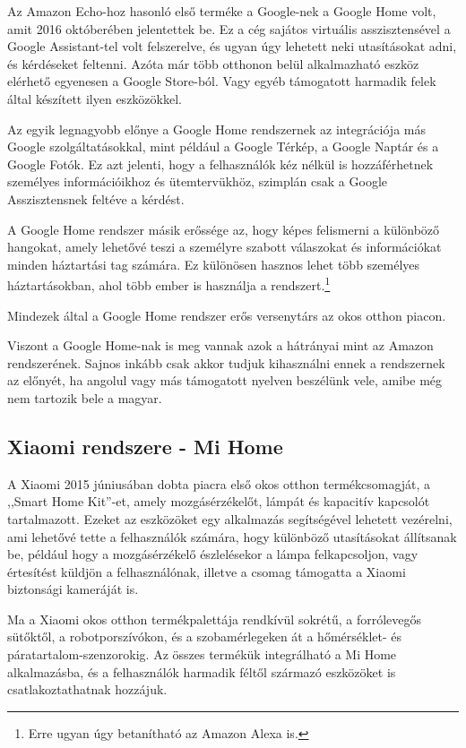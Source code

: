 \documentclass[
]{thesis-ekf}
\theoremstyle{definition}
\theoremstyle{remark}
\begin{document}
	Az Amazon Echo-hoz hasonló első terméke a Google-nek a Google Home volt, amit 2016 októberében jelentettek be. Ez a cég sajátos virtuális asszisztensével a Google Assistant-tel volt felszerelve, és ugyan úgy lehetett neki utasításokat adni, és kérdéseket feltenni. Azóta már több otthonon belül alkalmazható eszköz elérhető egyenesen a Google Store-ból. Vagy egyéb támogatott harmadik felek által készített ilyen eszközökkel.
	
	Az egyik legnagyobb előnye a Google Home rendszernek az integrációja más Google szolgáltatásokkal, mint például a Google Térkép, a Google Naptár és a Google Fotók. Ez azt jelenti, hogy a felhasználók kéz nélkül is hozzáférhetnek személyes információikhoz és ütemtervükhöz, szimplán csak a Google Asszisztensnek feltéve a kérdést.
	
	A Google Home rendszer másik erőssége az, hogy képes felismerni a különböző hangokat, amely lehetővé teszi a személyre szabott válaszokat és információkat minden háztartási tag számára. Ez különösen hasznos lehet több személyes háztartásokban, ahol több ember is használja a rendszert.\footnote{Erre ugyan úgy betanítható az Amazon Alexa is.}
	
 	Mindezek által a Google Home rendszer erős versenytárs az okos otthon piacon.
	
	Viszont a Google Home-nak is meg vannak azok a hátrányai mint az Amazon rendszerének. Sajnos inkább csak akkor tudjuk kihasználni ennek a rendszernek az előnyét, ha angolul vagy más támogatott nyelven beszélünk vele, amibe még nem tartozik bele a magyar.
	
	\subsection{Xiaomi rendszere - Mi Home}
	A Xiaomi 2015 júniusában dobta piacra első okos otthon termékcsomagját, a ,,Smart Home Kit''-et, amely mozgásérzékelőt, lámpát és kapacitív kapcsolót tartalmazott. Ezeket az eszközöket egy alkalmazás segítségével lehetett vezérelni, ami lehetővé tette a felhasználók számára, hogy különböző utasításokat állítsanak be, például hogy a mozgásérzékelő észlelésekor a lámpa felkapcsoljon, vagy értesítést küldjön a felhasználónak, illetve a csomag támogatta a Xiaomi biztonsági kameráját is. \cite{xiaomi-home}
	
	Ma a Xiaomi okos otthon termékpalettája rendkívül sokrétű, a forrólevegős sütőktől, a robotporszívókon, és a szobamérlegeken át a hőmérséklet- és páratartalom-szenzorokig. Az összes termékük integrálható a Mi Home alkalmazásba, és a felhasználók harmadik féltől származó eszközöket is csatlakoztathatnak hozzájuk.
	
\end{document}
